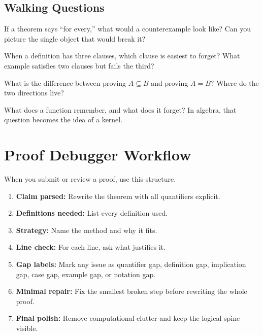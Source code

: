 \documentclass[11pt]{article}
\begin{document}
\subsection{Walking Questions}

\begin{walkbox}
If a theorem says ``for every,'' what would a counterexample look like? Can you picture the single object that would break it?
\end{walkbox}

\begin{walkbox}
When a definition has three clauses, which clause is easiest to forget? What example satisfies two clauses but fails the third?
\end{walkbox}

\begin{walkbox}
What is the difference between proving $A\subseteq B$ and proving $A=B$? Where do the two directions live?
\end{walkbox}

\begin{walkbox}
What does a function remember, and what does it forget? In algebra, that question becomes the idea of a kernel.
\end{walkbox}

\section{Proof Debugger Workflow}

When you submit or review a proof, use this structure.

\begin{enumerate}
\item \textbf{Claim parsed:} Rewrite the theorem with all quantifiers explicit.
\item \textbf{Definitions needed:} List every definition used.
\item \textbf{Strategy:} Name the method and why it fits.
\item \textbf{Line check:} For each line, ask what justifies it.
\item \textbf{Gap labels:} Mark any issue as quantifier gap, definition gap, implication gap, case gap, example gap, or notation gap.
\item \textbf{Minimal repair:} Fix the smallest broken step before rewriting the whole proof.
\item \textbf{Final polish:} Remove computational clutter and keep the logical spine visible.
\end{enumerate}
\end{document}
